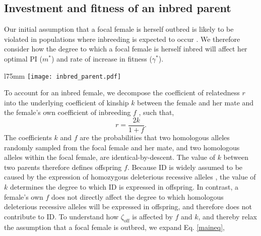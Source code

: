 \documentclass[10pt,letterpaper]{article}
\begin{document}
\subsection*{Investment and fitness of an inbred parent}

Our initial assumption that a focal female is herself outbred is likely to be violated in populations where inbreeding is expected to occur \cite[][]{Duthie2015a}. We therefore consider how the degree to which a focal female is herself inbred will affect her optimal PI ($m^{*}$) and rate of increase in fitness ($\gamma^{*}$).

\begin{wrapfigure}[14]{l}{75mm}
\texttt{[image: inbred\_parent.pdf]}
\captionsetup{labelformat=empty} 
\caption{} 
\label{inbred_parent} %
\end{wrapfigure} %
To account for an inbred female, we decompose the coefficient of relatedness $r$ into the underlying coefficient of kinship $k$ between the female and her mate and the female's own coefficient of inbreeding $f$  \cite[see][]{Hamilton1972, Michod1979}, such that,
\begin{equation} \label{rdef}
r = \frac{2k}{1 + f}.
\end{equation}
The coefficients $k$ and $f$ are the probabilities that two homologous alleles randomly sampled from the focal female and her mate, and two homologous alleles within the focal female, are identical-by-descent. The value of $k$ between two parents therefore defines offspring $f$. Because ID is widely assumed to be caused by the expression of homozygous deleterious recessive alleles \cite[][]{Charlesworth2009}, the value of $k$ determines the degree to which ID is expressed in offspring. In contrast, a female's own $f$ does not directly affect the degree to which homologous deleterious recessive alleles will be expressed in offspring, and therefore does not contribute to ID. To understand how $\zeta_{\textrm{off}}$ is affected by $f$ and $k$, and thereby relax the assumption that a focal female is outbred, we expand Eq. \ref{maineq},
\end{document}
